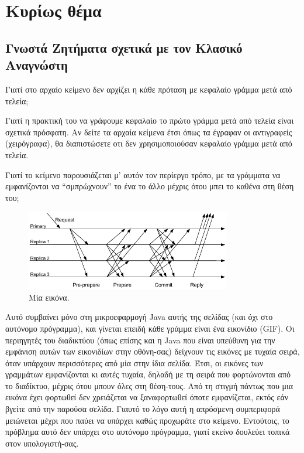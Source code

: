 \documentclass[11pt]{article}
\begin{document}
\section{Κυρίως θέμα}

\subsection{Γνωστά Ζητήματα σχετικά με τον Κλασικό Αναγνώστη}

Γιατί στο αρχαίο κείμενο δεν αρχίζει η κάθε πρόταση με κεφαλαίο γράμμα μετά από τελεία;

Γιατί η πρακτική του να γράφουμε κεφαλαίο το πρώτο γράμμα μετά από τελεία είναι σχετικά πρόσφατη. Αν δείτε τα αρχαία κείμενα έτσι όπως τα έγραφαν οι αντιγραφείς (χειρόγραφα), θα διαπιστώσετε οτι δεν χρησιμοποιούσαν κεφαλαίο γράμμα μετά από τελεία.

Γιατί το κείμενο παρουσιάζεται μ’ αυτόν τον περίεργο τρόπο, με τα γράμματα να εμφανίζονται να “σμπρώχνουν” το ένα το άλλο μέχρις ότου μπει το καθένα στη θέση του;

\begin{figure}[h]
   \centering
       \includegraphics[width=0.8\textwidth]{protocol}
   \caption{Μία εικόνα.}
\end{figure}

Αυτό συμβαίνει μόνο στη μικροεφαρμογή Java αυτής της σελίδας (και όχι στο αυτόνομο πρόγραμμα), και γίνεται επειδή κάθε γράμμα είναι ένα εικονίδιο (GIF). Οι περιηγητές του διαδικτύου (όπως επίσης και η Java που είναι υπεύθυνη για την εμφάνιση αυτών των εικονιδίων στην οθόνη-σας) δείχνουν τις εικόνες με τυχαία σειρά, όταν υπάρχουν περισσότερες από μία στην ίδια σελίδα. Έτσι, οι εικόνες των γραμμάτων εμφανίζονται κι αυτές τυχαία, δηλαδή με τη σειρά που φορτώνονται από το διαδίκτυο, μέχρις ότου μπουν όλες στη θέση-τους. Από τη στιγμή πάντως που μια εικόνα έχει φορτωθεί δεν χρειάζεται να ξαναφορτωθεί όποτε εμφανίζεται, εκτός εάν βγείτε από την παρούσα σελίδα. Γιαυτό το λόγο αυτή η απρόσμενη συμπεριφορά μειώνεται μέχρι που παύει να υπάρχει καθώς προχωράτε στο κείμενο. Εντούτοις, το πρόβλημα αυτό δεν υπάρχει στο αυτόνομο πρόγραμμα, γιατί εκείνο δουλεύει τοπικά στον υπολογιστή-σας.
\end{document}
